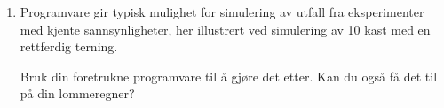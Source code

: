 \begin{enumerate}
\item Programvare gir typisk mulighet for simulering av utfall fra
      eksperimenter med kjente sannsynligheter, her illustrert ved simulering 
      av 10 kast med en rettferdig terning.
\begin{center}  \end{center}
Bruk din foretrukne programvare til å gjøre det etter. Kan du også
få det til på din lommeregner?



\end{enumerate}


\normalsize

